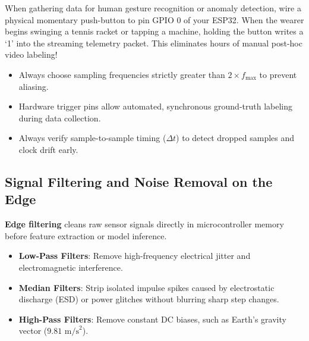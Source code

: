 \begin{iotbox}
When gathering data for human gesture recognition or anomaly detection, wire a physical momentary push-button to pin GPIO 0 of your ESP32. When the wearer begins swinging a tennis racket or tapping a machine, holding the button writes a `1' into the streaming telemetry packet. This eliminates hours of manual post-hoc video labeling!
\end{iotbox}

\begin{takeaways}
\begin{itemize}
    \item Always choose sampling frequencies strictly greater than $2 \times f_{\max}$ to prevent aliasing.
    \item Hardware trigger pins allow automated, synchronous ground-truth labeling during data collection.
    \item Always verify sample-to-sample timing ($\Delta t$) to detect dropped samples and clock drift early.
\end{itemize}
\end{takeaways}

\subsection{Signal Filtering and Noise Removal on the Edge}

\begin{keyidea}
\textbf{Edge filtering} cleans raw sensor signals directly in microcontroller memory before feature extraction or model inference. 
\begin{itemize}
    \item \textbf{Low-Pass Filters}: Remove high-frequency electrical jitter and electromagnetic interference.
    \item \textbf{Median Filters}: Strip isolated impulse spikes caused by electrostatic discharge (ESD) or power glitches without blurring sharp step changes.
    \item \textbf{High-Pass Filters}: Remove constant DC biases, such as Earth's gravity vector ($9.81\text{ m/s}^2$).
\end{itemize}
\end{keyidea}

